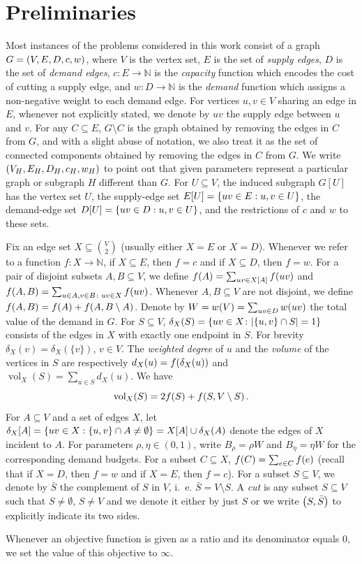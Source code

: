 \section{Preliminaries}

Most instances of the problems considered in this work consist of a graph $G=\mathopen{}\left( V,E,D,c,w \right)$, where $V$ is the vertex set, $E$ is the set of \emph{supply edges}, $D$ is the set of \emph{demand edges}, $c\colon E \to \mathbb{N}$ is the \emph{capacity} function which encodes the cost of cutting a supply edge, and $w\colon D\to \mathbb{N}$ is the \emph{demand} function which assigns a non-negative weight to each demand edge.
For vertices $u,v\in V$ sharing an edge in $E$, whenever not explicitly stated, we denote by $uv$ the supply edge between $u$ and $v$.
For any $C\subseteq E$, $G\setminus C$ is the graph obtained by removing the edges in $C$ from $G$, and with a slight abuse of notation, we also treat it as the set of connected components obtained by removing the edges in $C$ from $G$.
We write $\mathopen{}\left( V_H,E_H,D_H,c_H,w_H \right)$ to point out that given parameters represent a particular graph or subgraph $H$ different than $G$.
For $U\subseteq V$, the induced subgraph $G[U]$ has the vertex set $U$, the supply-edge set $E[U]=\mathopen{}\left\{ uv\in E:u,v\in U \right\}$, the demand-edge set $D[U]=\mathopen{}\left\{ uv\in D:u,v\in U \right\}$, and the restrictions of $c$ and $w$ to these sets.

Fix an edge set $X\subseteq\binom{V}{2}$ (usually either $X=E$ or $X=D$).
Whenever we refer to a function $f\colon X\to \mathbb{N}$, if $X\subseteq E$, then $f=c$ and if $X\subseteq D$, then $f=w$.
For a pair of disjoint subsets $A, B\subseteq V$, we define $f\mathopen{}\left( A \right)=\sum_{uv\in X[A]}f\mathopen{}\left( uv \right)$ and $f\mathopen{}\left( A,B \right)=\sum_{u\in A,v\in B\colon uv\in X}f\mathopen{}\left( uv \right)$.
Whenever $A, B\subseteq V$ are not disjoint, we define $f\mathopen{}\left( A,B \right)=f\mathopen{}\left( A \right)+f\mathopen{}\left( A,B\setminus A \right)$.
Denote by $W=w\mathopen{}\left( V \right)=\sum_{uv\in D}w\mathopen{}\left( uv \right)$ the total value of the demand in $G$.
For $S\subseteq V$, $\delta_{X}(S)=\mathopen{}\left\{ uv\in X\colon\mathopen{}\left| \mathopen{}\left\{ u,v \right\}\cap S \right|=1 \right\}$ consists of the edges in $X$ with exactly one endpoint in $S$.
For brevity $\delta_{X}(v)=\delta_{X}(\{v\})$, $v\in V$. The \emph{weighted degree} of $u$ and the \emph{volume} of the vertices in $S$ are respectively $
	d_X(u)=f\mathopen{}\left( \delta_X(u) \right)$ and $
	\operatorname{vol}_X(S)=\sum_{u\in S}d_X(u).$
We have
\begin{equation}\label{eq:demand-degree-identity}
	\operatorname{vol}_X(S)
	=2f\mathopen{}\left( S \right)+f\mathopen{}\left( S,V\setminus S \right).
\end{equation}
For $A\subseteq V$ and a set of edges $X$, let $\delta_X[A]=\mathopen{}\left\{ uv\in X:\mathopen{}\left\{ u,v \right\}\cap A\neq\emptyset \right\}=X[A]\cup\delta_X(A)$ denote the edges of $X$ incident to $A$.
For parameters $\rho,\eta\in(0,1)$, write $B_\rho=\rho W$ and $B_\eta=\eta W$ for the corresponding demand budgets.
For a subset $C\subseteq X$, $f\mathopen{}\left( C \right)=\sum_{e\in C}f\mathopen{}\left( e \right)$ (recall that if $X=D$, then $f=w$ and if $X=E$, then $f=c$).
For a subset $S\subseteq V$, we denote by $\bar{S}$ the complement of $S$ in $V$, i.~e. $\bar{S}=V\setminus S$.
A \emph{cut} is any subset $S\subseteq V$ such that $S\neq \emptyset$, $S\neq V$ and we denote it either by just $S$ or we write $\mathopen{}\left( S, \bar{S} \right)$ to explicitly indicate its two sides.

Whenever an objective function is given as a ratio and its denominator equals $0$, we set the value of this objective to $\infty$.

%
